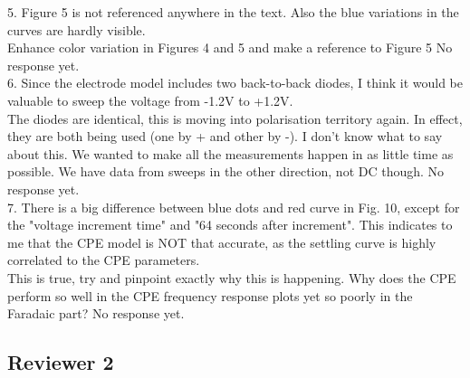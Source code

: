 \documentclass[journal, a4paper]{IEEEtran}
\begin{document}
{5. Figure 5 is not referenced anywhere in the text. Also the blue variations in the curves are hardly visible.\\
{\color{OliveGreen} 
    {\color{Red} Enhance color variation in Figures 4 and 5 and make a reference to Figure 5}
    No response yet.
}\\

6. Since the electrode model includes two back-to-back diodes, I think it would be valuable to sweep the voltage from -1.2V to +1.2V.\\
{\color{OliveGreen}
    {\color{Red} The diodes are identical, this is moving into polarisation territory again. In effect, they are both being used (one by + and other by -). I don't know what to say about this. We wanted to make all the measurements happen in as little time as possible. We have data from sweeps in the other direction, not DC though.}
    No response yet.
}\\

7. There is a big difference between blue dots and red curve in Fig. 10, except for the "voltage increment time" and "64 seconds after increment".  This indicates to me that the CPE model is NOT that accurate, as the settling curve is highly correlated to the CPE parameters.\\
{\color{OliveGreen}
    {\color{Red} This is true, try and pinpoint exactly why this is happening. Why does the CPE perform so well in the CPE frequency response plots yet so poorly in the Faradaic part?}
    No response yet.
}\\
}

\subsection*{Reviewer 2}
\end{document}
